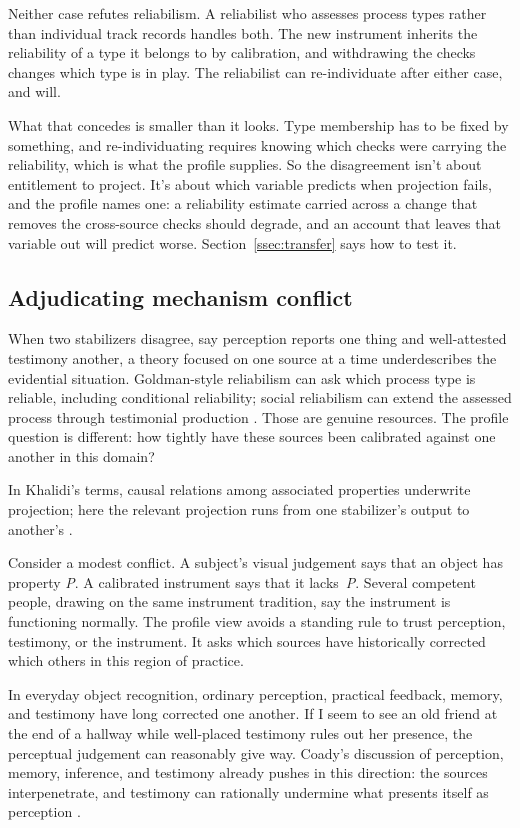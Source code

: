 \documentclass[12pt]{article}
\begin{document}
Neither case refutes reliabilism. A reliabilist
who assesses process types rather than individual track records handles both. The new
instrument inherits the reliability of a type it belongs to by calibration, and withdrawing
the checks changes which type is in play. The reliabilist can re-individuate after either
case, and will.

What that concedes is smaller than it looks. Type membership has to be fixed by something,
and re-individuating requires knowing which checks were carrying the reliability, which is
what the profile supplies. So the disagreement isn't about
entitlement to project. It's about which variable predicts when projection fails, and the
profile names one: a reliability estimate carried across a change that removes the
cross-source checks should degrade, and an account that leaves that variable out will
predict worse. Section~\ref{ssec:transfer} says how to test it.

\subsection{Adjudicating mechanism conflict}

When two stabilizers disagree, say perception reports one thing and well-attested
testimony another, a theory focused on one source at a time underdescribes the evidential
situation. Goldman-style reliabilism can ask which process type is reliable, including
conditional reliability; social reliabilism can extend the assessed process through
testimonial production
\citep{goldman_1979_what_is_justified_belief,goldberg_2010_relying_on_others}. Those
are genuine resources. The profile question is different: how tightly have these sources
been calibrated against one another in this domain?

In Khalidi's terms, causal relations among associated properties underwrite projection;
here the relevant projection runs from one stabilizer's output to another's
\citep{khalidi2013}.

Consider a modest conflict. A subject's visual judgement says that an object has property
\textit{P}. A calibrated instrument says that it lacks~\textit{P}. Several competent
people, drawing on the same instrument tradition, say the instrument is functioning normally. The profile
view avoids a standing rule to trust perception, testimony, or the instrument. It asks
which sources have historically corrected which others in this region of practice.

In everyday object recognition, ordinary perception, practical feedback, memory, and
testimony have long corrected one another. If I seem to see an old friend at the end of a
hallway while well-placed testimony rules out her presence, the perceptual judgement can
reasonably give way. Coady's discussion of perception, memory, inference, and testimony
already pushes in this direction: the sources interpenetrate, and testimony can rationally
undermine what presents itself as perception \citep{coady_1992_testimony}.
\end{document}
